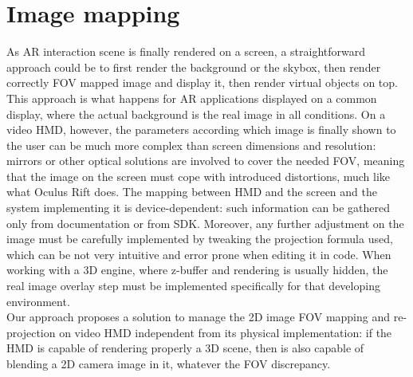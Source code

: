 \section{Image mapping}
As AR interaction scene is finally rendered on a screen, a straightforward approach could be to first render the background or the skybox, then render correctly FOV mapped image and display it, then render virtual objects on top. This approach is what happens for AR applications displayed on a common display, where the actual background is the real image in all conditions. On a video HMD, however, the parameters according which image is finally shown to the user can be much more complex than screen dimensions and resolution: mirrors or other optical solutions are involved to cover the needed FOV, meaning that the image on the screen must cope with introduced distortions, much like what Oculus Rift does. The mapping between HMD and the screen and the system implementing it is device-dependent: such information can be gathered only from documentation or from SDK. Moreover, any further adjustment on the image must be carefully implemented by tweaking the projection formula used, which can be not very intuitive and error prone when editing it in code. When working with a 3D engine, where z-buffer and rendering is usually hidden, the real image overlay step must be implemented specifically for that developing environment.\\
Our approach proposes a solution to manage the 2D image FOV mapping and re-projection on video HMD independent from its physical implementation: if the HMD is capable of rendering properly a 3D scene, then is also capable of blending a 2D camera image in it, whatever the FOV discrepancy.

